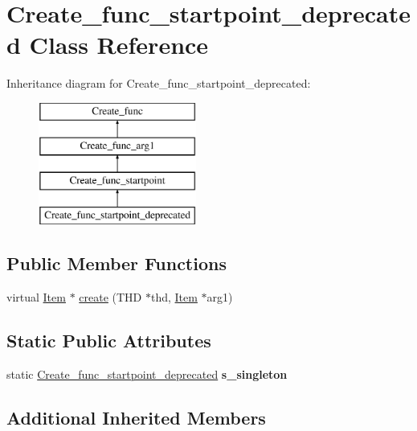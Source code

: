 \hypertarget{classCreate__func__startpoint__deprecated}{}\section{Create\+\_\+func\+\_\+startpoint\+\_\+deprecated Class Reference}
\label{classCreate__func__startpoint__deprecated}
Inheritance diagram for Create\+\_\+func\+\_\+startpoint\+\_\+deprecated\+:\begin{figure}[H]
\begin{center}
\leavevmode
\includegraphics[height=4.000000cm]{classCreate__func__startpoint__deprecated}
\end{center}
\end{figure}
\subsection*{Public Member Functions}
\begin{DoxyCompactItemize}
\item 
virtual \mbox{\hyperlink{classItem}{Item}} $\ast$ \mbox{\hyperlink{classCreate__func__startpoint__deprecated_a037938ac02aa1a8553c82c913b85f3c3}{create}} (T\+HD $\ast$thd, \mbox{\hyperlink{classItem}{Item}} $\ast$arg1)
\end{DoxyCompactItemize}
\subsection*{Static Public Attributes}
\begin{DoxyCompactItemize}
\item 
\mbox{\label{classCreate__func__startpoint__deprecated_a41aba7cd13a0c5411b6f540cab825adb}} 
static \mbox{\hyperlink{classCreate__func__startpoint__deprecated}{Create\+\_\+func\+\_\+startpoint\+\_\+deprecated}} {\bfseries s\+\_\+singleton}
\end{DoxyCompactItemize}
\subsection*{Additional Inherited Members}


